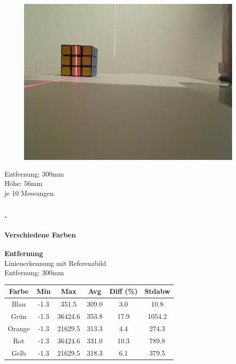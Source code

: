 \documentclass[xcolor=dvipsnames]{beamer}
\def\frametitlesec{\frametitle{\arabic{section}.\hspace{0.5ex}\insertsection}}
\def\framesubtitles#1{\framesubtitle{\hspace{3.5ex}#1}}
\begin{document}
\begin{frame}[noframenumbering]
\begin{figure}
\begin{minipage}{0.32\linewidth}
		\end{minipage}
		\hfill
		\begin{minipage}{0.32\linewidth}
			\includegraphics[width=\linewidth]{includes/test_color_3}
		\end{minipage}
	\end{figure}
	
	Entfernung: 300mm\\
	Höhe: 56mm\\
	je 10 Messungen
	
\end{frame}
	
\begin{frame}[noframenumbering]
	\frametitlesec
	\framesubtitles{Verschiedene Farben}
		\textbf{Entfernung}\\
		
		Linienerkennung mit Referenzbild\\
		Entfernung: 300mm
		\begin{tabular}{c|c|c|c|c|c}
			Farbe & Min & Max & Avg & Diff (\%) & Stdabw\\ \hline
Blau &-1.3 & 351.5 & 309.0 & 3.0 & 10.8\\
Grün &-1.3 & 36424.6 & 353.8 & 17.9 & 1054.2\\
Orange &-1.3 & 21629.5 & 313.3 & 4.4 & 274.3\\
Rot &-1.3 & 36424.6 & 331.0 & 10.3 & 789.8\\
Gelb &-1.3 & 21629.5 & 318.3 & 6.1 & 379.5\\
		\end{tabular}
		
\end{frame}
\end{document}
